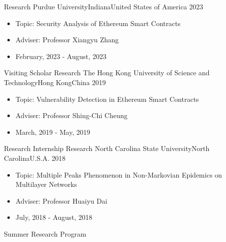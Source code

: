 %
%
%
\begin{experiences}
	\experience
	{Research} {Purdue University}{Indiana}{United States of America}
	{2023}    {
		\begin{itemize}
			\item Topic: Security Analysis of Ethereum Smart Contracts
			\item Adviser: Professor Xiangyu Zhang
			\item February, 2023 - August, 2023
		\end{itemize}
	}
	{Visiting Scholar}
	\emptySeparator
	\experience
	{Research} {The Hong Kong University of Science and Technology}{Hong Kong}{China}
	{2019}    {
		\begin{itemize}
			\item Topic: Vulnerability Detection in Ethereum Smart Contracts
			\item Adviser: Professor Shing-Chi Cheung
			\item March, 2019 - May, 2019
		\end{itemize}
	}
	{Research Internship}
	\emptySeparator
	\experience
	{Research}   {North Carolina State University}{North Carolina}{U.S.A.}
	{2018} {
		\begin{itemize}
			\item Topic: Multiple Peaks Phenomenon in Non-Markovian Epidemics on Multilayer Networks
			\item Adviser: Professor Huaiyu Dai
			\item July, 2018 - August, 2018
		\end{itemize}
	}
	{Summer Research Program}
\end{experiences}
